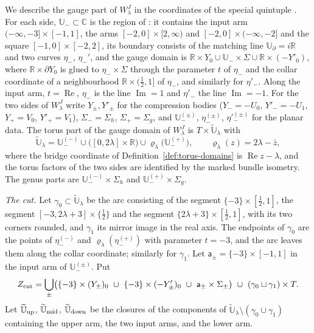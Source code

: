 \documentclass[11pt]{amsart}
\theoremstyle{definition}
\theoremstyle{remark}
\theoremstyle{plain}
\numberwithin{equation}{section}
\newcommand{\RR}{\mathbb{R}}
\newcommand{\CC}{\mathbb{C}}
\begin{document}
We describe the gauge part of $W^J_\lambda$ in the coordinates of the special
quintuple \cite[Section~3.1]{DFL}. For each side, $\mathbb U_-\subset\CC$ is the region of
\cite[Figure~1]{DFL}: it contains the input arm $(-\infty,-3]\times[-1,1]$, the arms
$[-2,0]\times[2,\infty)$ and $[-2,0]\times(-\infty,-2]$ and the square $[-1,0]\times[-2,2]$,
its boundary consists of the matching line $\mathbb U_\partial=i\RR$ and two curves $\eta_-$,
$\eta_-'$, and the gauge domain is
$\RR\times Y_0\cup \mathbb U_-\times\Sigma\cup\RR\times(-Y'_0)$, where $\RR\times\partial Y_0$ is glued to
$\eta_-\times\Sigma$ through the parameter $t$ of $\eta_-$ and the collar coordinate of a
neighbourhood $\RR\times(\tfrac12,1]$ of $\eta_-$, and similarly for $\eta'_-$. Along the
input arm, $t=\operatorname{Re}$, $\eta_-$ is the line $\operatorname{Im}=1$ and
$\eta'_-$ the line $\operatorname{Im}=-1$. For the two sides of $W^J_\lambda$ write
$Y_\pm,Y'_\pm$ for the compression bodies ($Y_-=-U_0$, $Y'_-=-U_1$, $Y_+=V_0$,
$Y'_+=V_1$), $\Sigma_-=\Sigma_h$, $\Sigma_+=\Sigma_g$, and $\mathbb U_-^{(\pm)}$, $\eta^{(\pm)}_-$,
$\eta'^{(\pm)}_-$ for the planar data. The torus part of the gauge domain of
$W^J_\lambda$ is $T\times\widetilde{\mathbb U}_\lambda$ with
\[
\widetilde{\mathbb U}_\lambda=\mathbb U_-^{(-)}\cup\bigl([0,2\lambda]\times\RR\bigr)\cup\varrho_\lambda\bigl(\mathbb U_-^{(+)}\bigr),
\qquad \varrho_\lambda(z)=2\lambda-\bar z ,
\]
where the bridge coordinate of Definition~\ref{def:torus-domains} is
$\operatorname{Re}z-\lambda$, and the torus factors of the two sides are identified by
the marked bundle isometry. The genus parts are $\mathbb U_-^{(-)}\times\Sigma_h$ and
$\mathbb U_-^{(+)}\times\Sigma_g$.

\emph{The cut.} Let $\gamma_0\subset\widetilde{\mathbb U}_\lambda$ be the arc consisting of the segment
$\{-3\}\times[\tfrac12,1]$, the segment $[-3,2\lambda+3]\times\{\tfrac12\}$ and the segment
$\{2\lambda+3\}\times[\tfrac12,1]$, with its two corners rounded, and $\gamma_1$ its mirror
image in the real axis. The endpoints of $\gamma_0$ are the points of $\eta^{(-)}_-$ and
$\varrho_\lambda(\eta^{(+)}_-)$ with parameter $t=-3$, and the arc leaves them along the
collar coordinate; similarly for $\gamma_1$. Let $\mathsf a_\pm=\{-3\}\times[-1,1]$ in
the input arm of $\mathbb U_-^{(\pm)}$. Put
\[
Z_{\rm cut}=\bigcup_\pm\bigl(\{-3\}\times(Y_\pm)_0\ \cup\ \{-3\}\times(-Y'_\pm)_0
\ \cup\ \mathsf a_\pm\times\Sigma_\pm\bigr)\ \cup\ (\gamma_0\sqcup\gamma_1)\times T .
\]
Let $\widetilde{\mathbb U}_{\rm up}$, $\widetilde{\mathbb U}_{\rm mid}$, $\widetilde{\mathbb U}_{\rm down}$ be the
closures of the components of $\widetilde{\mathbb U}_\lambda\setminus(\gamma_0\cup\gamma_1)$ containing
the upper arm, the two input arms, and the lower arm.
\end{document}
